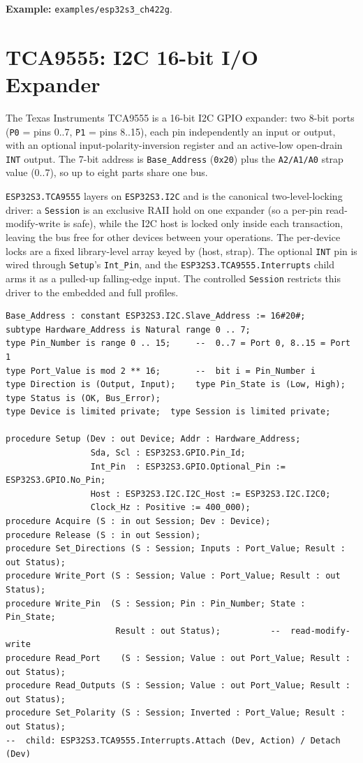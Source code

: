 \noindent\textbf{Example:} \texttt{examples/esp32s3\_ch422g}.

\section{TCA9555: I2C 16-bit I/O Expander}
\label{app:ext:tca9555}

The Texas Instruments TCA9555 is a 16-bit I2C GPIO expander: two 8-bit ports
(\texttt{P0} = pins 0..7, \texttt{P1} = pins 8..15), each pin independently an
input or output, with an optional input-polarity-inversion register and an
active-low open-drain \texttt{INT} output. The 7-bit address is
\texttt{Base\_Address} (\texttt{0x20}) plus the \texttt{A2/A1/A0} strap value
(0..7), so up to eight parts share one bus.

\texttt{ESP32S3.TCA9555} layers on \texttt{ESP32S3.I2C} and is the canonical
two-level-locking driver: a \texttt{Session} is an exclusive RAII hold on one
expander (so a per-pin read-modify-write is safe), while the I2C host is locked
only inside each transaction, leaving the bus free for other devices between
your operations. The per-device locks are a fixed library-level array keyed by
(host, strap). The optional \texttt{INT} pin is wired through \texttt{Setup}'s
\texttt{Int\_Pin}, and the \texttt{ESP32S3.TCA9555.Interrupts} child arms it as a
pulled-up falling-edge input. The controlled \texttt{Session} restricts this
driver to the embedded and full profiles.

\begin{lstlisting}
Base_Address : constant ESP32S3.I2C.Slave_Address := 16#20#;
subtype Hardware_Address is Natural range 0 .. 7;
type Pin_Number is range 0 .. 15;     --  0..7 = Port 0, 8..15 = Port 1
type Port_Value is mod 2 ** 16;       --  bit i = Pin_Number i
type Direction is (Output, Input);    type Pin_State is (Low, High);
type Status is (OK, Bus_Error);
type Device is limited private;  type Session is limited private;

procedure Setup (Dev : out Device; Addr : Hardware_Address;
                 Sda, Scl : ESP32S3.GPIO.Pin_Id;
                 Int_Pin  : ESP32S3.GPIO.Optional_Pin := ESP32S3.GPIO.No_Pin;
                 Host : ESP32S3.I2C.I2C_Host := ESP32S3.I2C.I2C0;
                 Clock_Hz : Positive := 400_000);
procedure Acquire (S : in out Session; Dev : Device);
procedure Release (S : in out Session);
procedure Set_Directions (S : Session; Inputs : Port_Value; Result : out Status);
procedure Write_Port (S : Session; Value : Port_Value; Result : out Status);
procedure Write_Pin  (S : Session; Pin : Pin_Number; State : Pin_State;
                      Result : out Status);          --  read-modify-write
procedure Read_Port    (S : Session; Value : out Port_Value; Result : out Status);
procedure Read_Outputs (S : Session; Value : out Port_Value; Result : out Status);
procedure Set_Polarity (S : Session; Inverted : Port_Value; Result : out Status);
--  child: ESP32S3.TCA9555.Interrupts.Attach (Dev, Action) / Detach (Dev)
\end{lstlisting}


